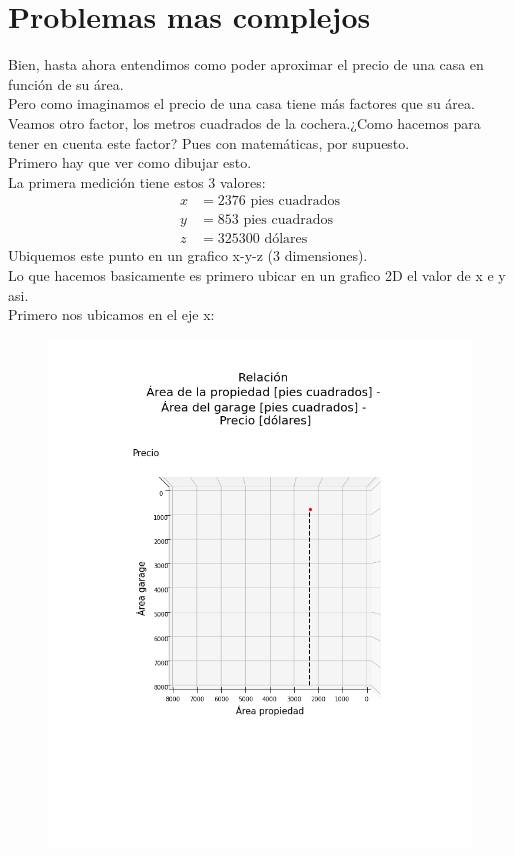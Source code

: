 \documentclass{article}
\begin{document}
\section{Problemas mas complejos}
Bien, hasta ahora entendimos como poder aproximar el precio de una casa en función de su área.\\
Pero como imaginamos el precio de una casa tiene más factores que su área. Veamos otro factor, los metros cuadrados de la cochera.¿Como hacemos para tener en cuenta este factor? Pues con matemáticas, por supuesto.\\
Primero hay que ver como dibujar esto.\\
La primera medición tiene estos 3 valores:
\begin{equation*}
    \begin{split}
        x&=2376 \text{ pies cuadrados}\\
        y&=853 \text{ pies cuadrados}\\
        z&=325300 \text{ dólares}
    \end{split}
\end{equation*}
Ubiquemos este punto en un grafico x-y-z (3 dimensiones).\\
Lo que hacemos basicamente es primero ubicar en un grafico 2D el valor de x e y asi.\\
Primero nos ubicamos en el eje x:\\
\begin{figure}[h!]
\includegraphics[scale=0.5]{Imagenes/ubicacion_en_x.png}
\centering
\end{figure}
\end{document}
